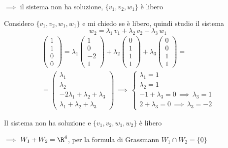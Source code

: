 {\begin{enumerate}
        $\implies$ il sistema non ha soluzione, $\{v_1, v_2, w_1\}$ è libero
        
        Considero $\{v_1, v_2, w_1, w_1\}$ e mi chiedo se è libero, quindi studio il sistema \[
            w_2=\lambda_1\,v_1 + \lambda_2\,v_2 + \lambda_3\,w_1
        \]
        \begin{multline*}
            \begin{pmatrix}
                1\\ 1\\ 0\\ 0
            \end{pmatrix}=\lambda_1 \begin{pmatrix}
                1\\ 0\\ -2\\ 1
            \end{pmatrix}+\lambda_2 \begin{pmatrix}
                0\\1\\1\\1
            \end{pmatrix}+\lambda_3 \begin{pmatrix}
                0\\0\\1\\1
            \end{pmatrix}=\\=\begin{pmatrix}
                \lambda_1\\ \lambda_2\\-2\lambda_1+\lambda_2+\lambda_3\\ \lambda_1+\lambda_2+\lambda_3
            \end{pmatrix} \,\implies\,
            \begin{cases}
                \lambda_1=1\\
                \lambda_2=1\\
                -1+\lambda_3=0 \,\implies\, \lambda_3=1\\
                2+\lambda_3=0 \,\implies\, \lambda_3=-2
            \end{cases}
        \end{multline*}

        Il sistema non ha soluzione e $\{v_1, v_2, w_1, w_2\}$ è libero 
        
        $\implies$ $W_1+W_2=\R^4$, per la formula di Grassmann $W_1 \cap W_2=\{\underline{0}\}$
        

\end{enumerate}}
